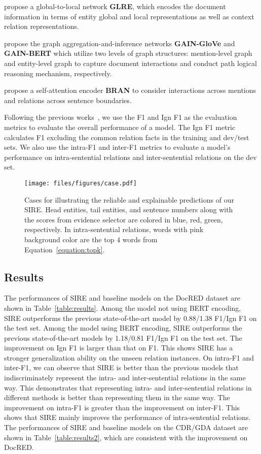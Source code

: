 \documentclass[11pt,a4paper]{article}
\begin{document}
\citet{GLRE} propose a global-to-local network \textbf{GLRE}, which encodes the document information in terms of entity global and local representations as well as context relation representations. 

\citet{GAIN} propose the graph aggregation-and-inference networks \textbf{GAIN-GloVe} and \textbf{GAIN-BERT} which utilize two levels of graph structures: mention-level graph and entity-level graph to capture document interactions and conduct path logical reasoning mechanism, respectively. 

\citet{BRAN} propose a self-attention encoder \textbf{BRAN} to consider interactions across mentions and relations across sentence boundaries.



Following the previous works~\citep{DocRED-paper,GAIN}, we use the F1 and Ign F1 as the evaluation metrics to evaluate the overall performance of a model. The Ign F1 metric calculates F1 excluding the common relation facts in the training and dev/test sets. We also use the intra-F1 and inter-F1 metrics to evaluate a model's performance on intra-sentential relations and inter-sentential relations on the dev set.

\begin{figure*}
    \centering
    \texttt{[image: files/figures/case.pdf]}
    \caption{Cases for illustrating the reliable and explainable predictions of our SIRE. Head entities, tail entities, and sentence numbers along with the scores from evidence selector are colored in blue, red, green, respectively. In intra-sentential relations, words with pink background color are the top $4$ words from Equation~\ref{equation:topk}. }
    \label{fig:case}
\end{figure*}

\subsection{Results\label{ssec:quantitative}}
The performances of SIRE and baseline models on the DocRED dataset are shown in Table~\ref{table:results}. Among the model not using BERT encoding, SIRE outperforms the previous state-of-the-art model by 0.88/1.38 F1/Ign F1 on the test set. Among the model using BERT encoding, SIRE outperforms the previous state-of-the-art models by 1.18/0.81 F1/Ign F1 on the test set. The improvement on Ign F1 is larger than that on F1. This shows SIRE has a stronger generalization ability on the unseen relation instances. On intra-F1 and inter-F1, we can observe that SIRE is better than the previous models that indiscriminately represent the intra- and inter-sentential relations in the same way. This demonstrates that representing intra- and inter-sentential relations in different methods is better than representing them in the same way. The improvement on intra-F1 is greater than the improvement on inter-F1. This shows that SIRE mainly improves the performance of intra-sentential relations. 
The performances of SIRE and baseline models on the CDR/GDA dataset are shown in Table~\ref{table:results2}, which are consistent with the improvement on DocRED.
\end{document}
